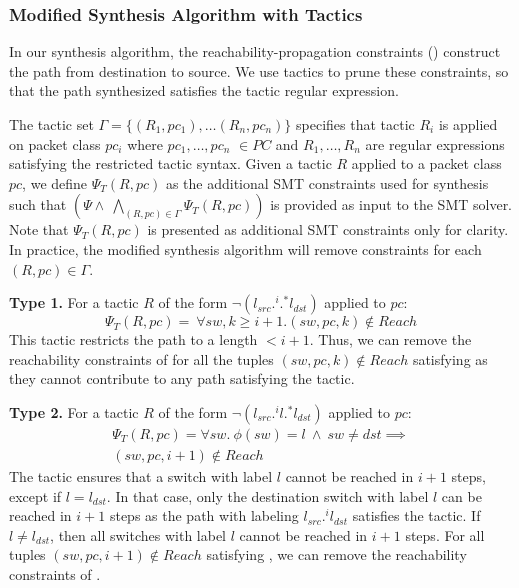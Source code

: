 \subsubsection{Modified Synthesis Algorithm with Tactics}
In our synthesis algorithm, the reachability-propagation constraints () 
construct the path from destination to source. We use tactics to prune these constraints, so that
the path synthesized satisfies the tactic regular expression.  

The tactic set $\Gamma = \{(R_1, pc_1), \ldots (R_n, pc_n)\}$
specifies that tactic $R_i$ is applied on packet class $pc_i$ where 
$pc_1, \ldots, pc_n$ $\in PC$ and $R_1,\ldots,R_n$ are regular
expressions satisfying the restricted tactic syntax. 
Given a tactic $R$ applied to a packet class $pc$, 
we define $\Psi_T(R,pc)$ as the additional SMT constraints used for 
synthesis such that  $(\Psi \wedge\ \bigwedge\limits_{(R, pc) \in \Gamma} \Psi_T(R,pc))$ 
is provided as input to the SMT solver.
	Note that $\Psi_T(R,pc)$ is presented as additional SMT 
constraints only for clarity. 
In practice, the modified synthesis algorithm will remove constraints for each 
$(R,pc)\in \Gamma$.

\noindent\textbf{Type 1.} For a tactic $R$ of the form $\neg (l_{src} .^i .^* l_{dst})$ applied to $pc$: 
\begin{equation} \label{eq:type1}
	\Psi_T(R, pc) = ~ \forall sw,k \geq i + 1. (sw,pc,k) \notin Reach
\end{equation}
This tactic restricts the path to a length $ < i + 1$. Thus, we can remove the reachability constraints  of  
for all the tuples $(sw,pc,k) \notin Reach$ satisfying 
as they cannot contribute to any path satisfying the tactic.  

\noindent\textbf{Type 2.} For a tactic $R$  
of the form $\neg (l_{src}  .^i l .^* l_{dst})$ applied to $pc$:
\begin{multline} \label{eq:t1}
\Psi_T(R,pc) = \forall sw.~ \phi(sw) = l ~\wedge~ sw \not= dst \implies \\ 
(sw, pc, i + 1) \notin Reach
\end{multline}
The tactic ensures that a switch with label $l$ cannot be reached in $i+1$
steps, except if $l = l_{dst}$. In that case,
only the destination switch with label $l$ can be reached in $i+1$ steps as 
the path with labeling $l_{src}.^i l_{dst}$ satisfies the tactic. If $l \not= l_{dst}$, then
all switches with label $l$ cannot be reached in $i+1$ steps. For all tuples
$(sw, pc, i+1) \notin Reach$ satisfying , we can remove the reachability constraints of .


